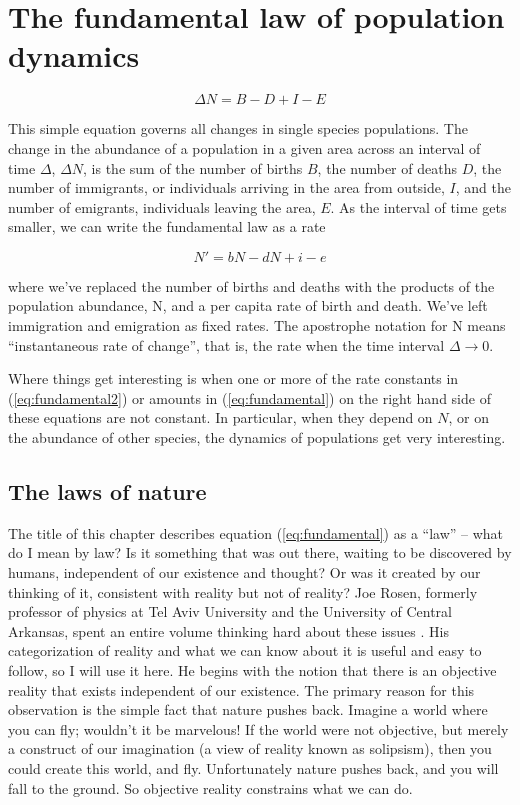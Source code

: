 \documentclass[]{book}
\begin{document}
\chapter{The fundamental law of population
dynamics}\label{chap:fundamental}

\begin{equation}
  \Delta N = B - D + I - E
  \label{eq:fundamental}
\end{equation}

This simple equation governs all changes in single species populations.
The change in the abundance of a population in a given area across an
interval of time \(\Delta\), \(\Delta N\), is the sum of the number of
births \(B\), the number of deaths \(D\), the number of immigrants, or
individuals arriving in the area from outside, \(I\), and the number of
emigrants, individuals leaving the area, \(E\). As the interval of time
gets smaller, we can write the fundamental law as a rate

\begin{equation}
N' = bN - dN + i - e
\label{eq:fundamental2}
\end{equation}

where we've replaced the number of births and deaths with the products
of the population abundance, N, and a per capita rate of birth and
death. We've left immigration and emigration as fixed rates. The
apostrophe notation for N means ``instantaneous rate of change'', that
is, the rate when the time interval \(\Delta \rightarrow 0\).

Where things get interesting is when one or more of the rate constants
in (\eqref{eq:fundamental2}) or amounts in (\eqref{eq:fundamental}) on the
right hand side of these equations are not constant. In particular, when
they depend on \(N\), or on the abundance of other species, the dynamics
of populations get very interesting.

\section{The laws of nature}\label{the-laws-of-nature}

The title of this chapter describes equation (\eqref{eq:fundamental}) as a
``law'' -- what do I mean by law? Is it something that was out there,
waiting to be discovered by humans, independent of our existence and
thought? Or was it created by our thinking of it, consistent with
reality but not of reality? Joe Rosen, formerly professor of physics at
Tel Aviv University and the University of Central Arkansas, spent an
entire volume thinking hard about these issues \citep{rosen2010lawless}.
His categorization of reality and what we can know about it is useful
and easy to follow, so I will use it here. He begins with the notion
that there is an objective reality that exists independent of our
existence. The primary reason for this observation is the simple fact
that nature pushes back. Imagine a world where you can fly; wouldn't it
be marvelous! If the world were not objective, but merely a construct of
our imagination (a view of reality known as solipsism), then you could
create this world, and fly. Unfortunately nature pushes back, and you
will fall to the ground. So objective reality constrains what we can do.
\end{document}
